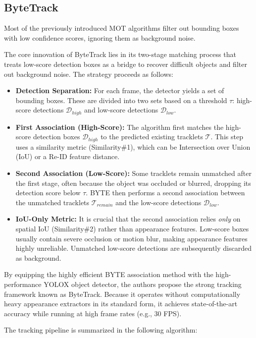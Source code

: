 \documentclass[10pt,twocolumn,letterpaper]{article}
\begin{document}
\subsection{ByteTrack}
Most of the previously introduced MOT algorithms filter out bounding boxes with low confidence scores, ignoring them as background noise.

The core innovation of \cite{bytetrack}ByteTrack lies in its two-stage matching process that treats low-score detection boxes as a bridge to recover difficult objects and filter out background noise. The strategy proceeds as follows:

\begin{itemize}
    \item \textbf{Detection Separation:} For each frame, the detector yields a set of bounding boxes. These are divided into two sets based on a threshold $\tau$: high-score detections $\mathcal{D}_{high}$ and low-score detections $\mathcal{D}_{low}$.
    \item \textbf{First Association (High-Score):} The algorithm first matches the high-score detection boxes $\mathcal{D}_{high}$ to the predicted existing tracklets $\mathcal{T}$. This step uses a similarity metric (Similarity\#1), which can be Intersection over Union (IoU) or a Re-ID feature distance.
    \item \textbf{Second Association (Low-Score):} Some tracklets remain unmatched after the first stage, often because the object was occluded or blurred, dropping its detection score below $\tau$. BYTE then performs a second association between the unmatched tracklets $\mathcal{T}_{remain}$ and the low-score detections $\mathcal{D}_{low}$. 
    \item \textbf{IoU-Only Metric:} It is crucial that the second association relies \textit{only} on spatial IoU (Similarity\#2) rather than appearance features. Low-score boxes usually contain severe occlusion or motion blur, making appearance features highly unreliable. Unmatched low-score detections are subsequently discarded as background.
\end{itemize}


By equipping the highly efficient BYTE association method with the high-performance YOLOX object detector, the authors propose the strong tracking framework known as ByteTrack. Because it operates without computationally heavy appearance extractors in its standard form, it achieves state-of-the-art accuracy while running at high frame rates (e.g., 30 FPS).

The tracking pipeline is summarized in the following algorithm:
\end{document}
